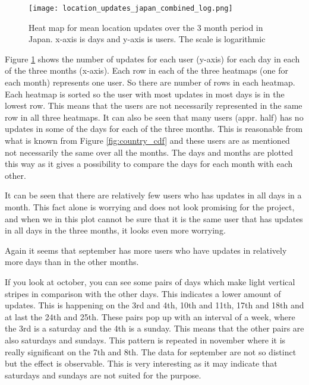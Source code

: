 \begin{figure}[H]
    \hspace*{-1.5cm}
    \centering
    \texttt{[image: location\_updates\_japan\_combined\_log.png]}
    \caption{Heat map for mean location updates over the 3 month period in Japan. x-axis is days and y-axis is users. The scale is logarithmic}
    \vspace{-12pt}
    \label{fig:heatmap_japan_combined}
\end{figure}
Figure \ref{fig:heatmap_japan_combined} shows the number of updates for each user (y-axis) for each day in each of the three months (x-axis). Each row in each of the three heatmaps (one for each month) represents one user. So there are \numberUsersJapan{} number of rows in each heatmap.  Each heatmap is sorted so the user with most updates in most days is in the lowest row. This means that the users are not necessarily represented in the same row in all three heatmaps. It can also be seen that many users (appr. half) has no updates in some of the days for each of the three months. This is reasonable from what is known from Figure \ref{fig:country_cdf} and these users are as mentioned not necessarily the same over all the months. 
The days and months are plotted this way as it gives a possibility to compare the days for each month with each other. 

It can be seen that there are relatively few users who has updates in all days in a month. This fact alone is worrying and does not look promising for the project, and when we in this plot cannot be sure that it is the same user that has updates in all days in the three months, it looks even more worrying. 

Again it seems that september has more users who have updates in relatively more days than in the other months. 

If you look at october, you can see some pairs of days which make light vertical stripes in comparison with the other days. This indicates a lower amount of updates. This is happening  on the 3rd and 4th, 10th and 11th, 17th and 18th and at last the 24th and 25th. These pairs pop up with an interval of a week, where the 3rd is a saturday and the 4th is a sunday. This means that the other pairs are also saturdays and sundays. This pattern is repeated in november where it is really significant on the 7th and 8th. The data for september are not so distinct but the effect is observable. This is very interesting as it may indicate that saturdays and sundays are not suited for the purpose. 

